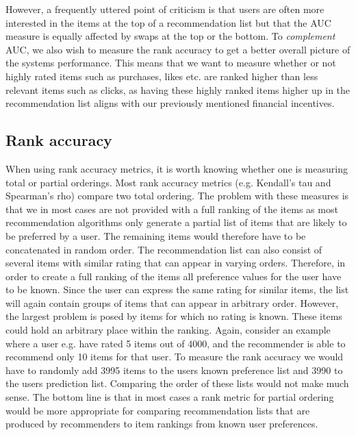 However, a frequently uttered point of criticism is that users are often more interested in the items
at the top of a recommendation list but that the AUC measure is equally affected by swaps at the top
or the bottom. To \emph{complement} AUC, we also wish to measure the rank accuracy to get a better
overall picture of the systems performance. This means that we want to measure whether or not
highly rated items such as purchases, likes etc. are ranked higher than less relevant items such as clicks,
as having these highly ranked items higher up in the recommendation list aligns with our previously
mentioned financial incentives.

\subsection{Rank accuracy}

When using rank accuracy metrics, it is worth knowing whether one is measuring total or partial orderings.
Most rank accuracy metrics (e.g. Kendall's tau and Spearman's rho) compare two total ordering. The problem
with these measures is that we in most cases are not provided with a full ranking of the items as most recommendation
algorithms only generate a partial list of items that are likely to be preferred by a user. The remaining items
would therefore have to be concatenated in random order. The recommendation list can also consist of several
items with similar rating that can appear in varying orders. Therefore, in order to create a full ranking of
the items all preference values for the user have to be known. Since the user can express the same rating for similar
items, the list will again contain groups of items that can appear in arbitrary order. However, the largest problem
is posed by items for which no rating is known. These items could hold an arbitrary place within the ranking.
Again, consider an example where a user e.g. have rated 5 items out of 4000, and the recommender is able to recommend
only 10 items for that user. To measure the rank accuracy we would have to randomly add 3995 items to the users known
preference list and 3990 to the users prediction list. Comparing the order of these lists would not make much sense.
The bottom line is that in most cases a rank metric for partial ordering would be more appropriate for comparing
recommendation lists that are produced by recommenders to item rankings from known user preferences.

